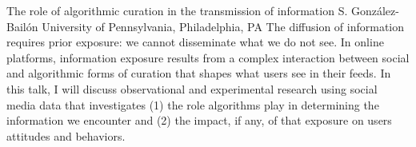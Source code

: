 
    \begin{abstract_online}{The role of algorithmic curation in the transmission of information}{%
        S. González-Bailón}{%
        }{%
        University of Pennsylvania, Philadelphia, PA}
    The diffusion of information requires prior exposure: we cannot disseminate what we do not see. In online platforms, information exposure results from a complex interaction between social and algorithmic forms of curation that shapes what users see in their feeds. In this talk, I will discuss observational and experimental research using social media data that investigates (1) the role algorithms play in determining the information we encounter and (2) the impact, if any, of that exposure on users attitudes and behaviors. 
    
    \end{abstract_online}
    